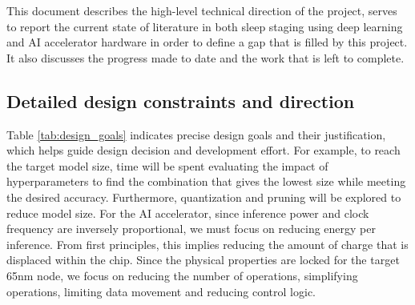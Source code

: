 \documentclass[12pt, hidelinks]{article}
\begin{document}
    This document describes the high-level technical direction of the project, serves to report the current state of literature in both sleep staging using deep learning and AI accelerator hardware in order to define a gap that is filled by this project.
    It also discusses the progress made to date and the work that is left to complete.

    \subsection{Detailed design constraints and direction}
    Table \ref{tab:design_goals} indicates precise design goals and their justification, which helps guide design decision and development effort. For example, to reach the target model size, time will be spent evaluating the impact of hyperparameters to find the combination
    that gives the lowest size while meeting the desired accuracy. Furthermore, quantization and pruning will be explored to reduce model size. For the AI accelerator, since inference power and clock frequency are inversely proportional, we must focus on reducing energy per inference.
    From first principles, this implies reducing the amount of charge that is displaced within the chip. Since the physical properties are locked for the target 65nm node, we focus on reducing the number of operations, simplifying operations, limiting data movement and reducing
    control logic.
    
\end{document}
